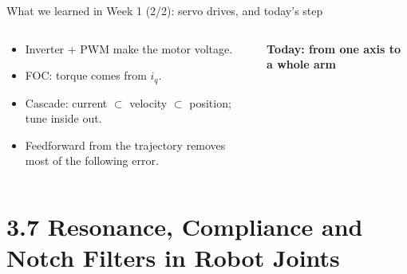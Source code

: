 \documentclass[aspectratio=169,10pt]{beamer}
\begin{document}
\begin{frame}[t]{What we learned in Week 1 (2/2): servo drives, and today's step}
\begin{columns}[T,onlytextwidth]
\begin{defbox}
\begin{itemize}\small
\item Inverter + PWM make the motor voltage.
\item FOC: torque comes from $i_q$.
\item Cascade: current $\subset$ velocity $\subset$ position; tune inside out.
\item Feedforward from the trajectory removes most of the following error.
\end{itemize}
\end{defbox}
\small\textbf{Today: from one axis to a whole arm}\\[2mm]
\centering
{}
\end{columns}
\end{frame}

\section[3.7 Resonance \& notch filters]{3.7 Resonance, Compliance and Notch Filters in Robot Joints}
\end{document}
